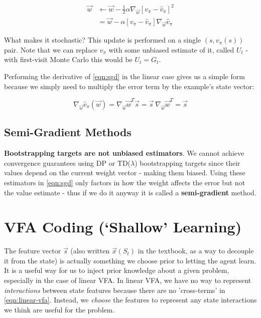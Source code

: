 \documentclass[11pt]{report}
\begin{document}
\begin{align}
	\vec{w} &\xleftarrow{} \vec{w} - \frac{1}{2}\alpha \nabla_{\vec{w}} \left[ v_\pi - \hat{v}_\pi\right]^2\\
		\label{eqn:sgd}
		&= 	\vec{w} - \alpha\left[ v_\pi - \hat{v}_\pi \right] \nabla_{\vec{w}}\hat{v}_\pi
\end{align}

What makes it stochastic? This update is performed on a single $(s, v_\pi(s))$ pair. Note that we can replace $v_\pi$ with some unbiased estimate of it, called $U_t$ - with first-visit Monte Carlo this would be $U_t = G_t$.

Performing the derivative of \autoref{eqn:sgd} in the linear case gives us a simple form because we simply need to multiply the error term by the example's state vector:

\begin{equation}
	\label{eqn:linear-sgd}
	\nabla_{\vec{w}} \hat{v}_\pi(\vec{w}) = \nabla_{\vec{w}} \vec{w}^T\vec{s} = \vec{s}\ \nabla_{\vec{w}}\vec{w}^T = \vec{s}
\end{equation}

\subsection{Semi-Gradient Methods}\label{sec:semi-gradient-methods}
\textbf{Bootstrapping targets are not unbiased estimators}. We cannot achieve convergence guarantees using DP or TD($\lambda$) bootstrapping targets since their values depend on the current weight vector - making them biased. Using these estimators in \autoref{eqn:sgd} only factors in how the weight affects the error but not the value estimate - thus if we do it anyway it is called a \textbf{semi-gradient} method.



\section{VFA Coding (`Shallow' Learning)}
The feature vector $\vec{s}$ (also written $\vec{x}(S_t)$ in the textbook, as a way to decouple it from the state) is actually something we choose prior to letting the agent learn. It is a useful way for us to inject prior knowledge about a given problem, especially in the case of linear VFA. In linear VFA, we have no way to represent \textit{interactions} between state features because there are no 'cross-terms' in \autoref{eqn:linear-vfa}. Instead, we \textit{choose} the features to represent any state interactions we think are useful for the problem.
\end{document}
